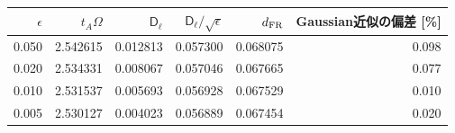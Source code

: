 \begin{tabular}{rrrrrr}\toprule
$\epsilon$ & $t_A\Omega$ & $\mathsf D_{\ell}$ & $\mathsf D_{\ell}/\sqrt{\epsilon}$ & $d_{\rm FR}$ & Gaussian近似の偏差 [\%]\\\midrule
0.050 & 2.542615 & 0.012813 & 0.057300 & 0.068075 & 0.098 \\
0.020 & 2.534331 & 0.008067 & 0.057046 & 0.067665 & 0.077 \\
0.010 & 2.531537 & 0.005693 & 0.056928 & 0.067529 & 0.010 \\
0.005 & 2.530127 & 0.004023 & 0.056889 & 0.067454 & 0.020 \\
\bottomrule\end{tabular}
